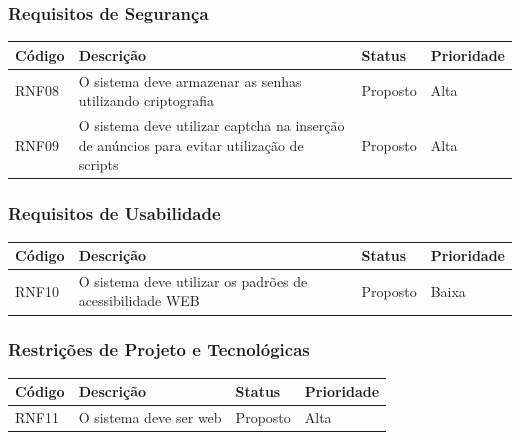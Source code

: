 \documentclass[a4paper, 12pt]{article}
\begin{document}
\subsubsection{Requisitos de Segurança}
\begin{table}[ht]
	\centering

	\begin{tabular}{p{2cm}p{7cm}p{2cm}p{2cm}}
		\hline
		\cellcolor{gray}Código&\cellcolor{gray}Descrição&\cellcolor{gray}Status&\cellcolor{gray}Prioridade  \\
		\hline
		RNF08&O sistema deve armazenar as senhas utilizando criptografia&Proposto&Alta\\
        RNF09&O sistema deve utilizar captcha na inser\c{c}\~{a}o de an\'{u}ncios para evitar utiliza\c{c}\~{a}o de scripts&Proposto&Alta\\
		\hline
	\end{tabular}
\end{table}%
\subsubsection{Requisitos de Usabilidade}
\begin{table}[ht]
	\rowcolors{1}{}{}
	\centering

	\begin{tabular}{p{2cm}p{7cm}p{2cm}p{2cm}}
		\hline
		\cellcolor{gray}Código&\cellcolor{gray}Descrição&\cellcolor{gray}Status&\cellcolor{gray}Prioridade  \\
		\hline
		RNF10&O sistema deve utilizar os padr\~{o}es de acessibilidade WEB&Proposto&Baixa\\
		\hline
	\end{tabular}
\end{table}%
\subsubsection{Restrições de Projeto e Tecnológicas}
\begin{table}[ht]
	\centering

	\begin{tabular}{p{2cm}p{7cm}p{2cm}p{2cm}}
		\hline
		\cellcolor{gray}Código&\cellcolor{gray}Descrição&\cellcolor{gray}Status&\cellcolor{gray}Prioridade  \\
		\hline
        RNF11&O sistema deve ser web&Proposto&Alta\\
		\hline
	\end{tabular}
\end{table}%
\newpage
\end{document}
